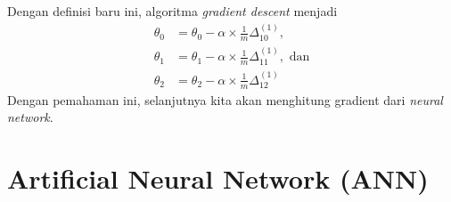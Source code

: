 \documentclass[12pt]{article}
\begin{document}
Dengan definisi baru ini, algoritma \textit{gradient descent} menjadi 
\begin{align}
	\theta_0 &= \theta_0 - \alpha \times \frac{1}{m} \Delta_{10}^{(1)}, \label{eq:gradient-descent-with-Delta-1} \\
	\theta_1 &= \theta_1 - \alpha \times \frac{1}{m} \Delta_{11}^{(1)}, \text{ dan} \label{eq:gradient-descent-with-Delta-2} \\	
	\theta_2 &= \theta_2 - \alpha \times \frac{1}{m} \Delta_{12}^{(1)}
	 \label{eq:gradient-descent-with-Delta-3}	
\end{align}
Dengan pemahaman ini, selanjutnya kita akan menghitung gradient dari \textit{neural network}.

\section*{Artificial Neural Network (ANN)}
\end{document}
